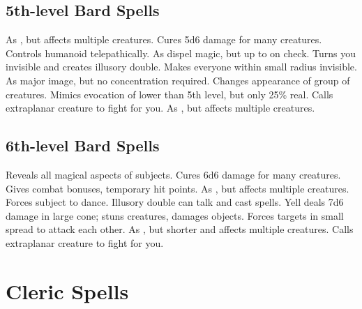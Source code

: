 \subsection{5th-level Bard Spells}
\begin{spelllist}
   As , but affects multiple creatures.
   Cures 5d6 damage for many creatures.
   Controls humanoid telepathically.
   As dispel magic, but up to  on check.
   Turns you invisible and creates illusory double.
   Makes everyone within small radius invisible.
   As major image, but no concentration required.
   Changes appearance of group of creatures.
   Mimics evocation of lower than 5th level, but only 25\% real.
   Calls extraplanar creature to fight for you.
   As , but affects multiple creatures.
\end{spelllist}

\subsection{6th-level Bard Spells}
\begin{spelllist}
  \F Reveals all magical aspects of subjects.
   Cures 6d6 damage for many creatures.
   Gives combat bonuses, temporary hit points.
   As , but affects multiple creatures.
   Forces subject to dance.
   Illusory double can talk and cast spells.
   Yell deals 7d6 damage in large cone; stuns creatures, damages objects.
   Forces targets in small spread to attack each other.
   As , but shorter and affects multiple creatures.
   Calls extraplanar creature to fight for you.
\end{spelllist}

\section{Cleric Spells}

